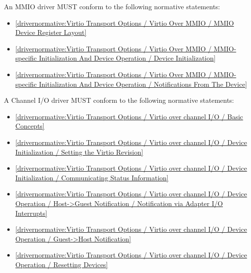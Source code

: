 \label{sec:Conformance / Driver Conformance / MMIO Driver Conformance}

An MMIO driver MUST conform to the following normative statements:

\begin{itemize}
\item \ref{drivernormative:Virtio Transport Options / Virtio Over MMIO / MMIO Device Register Layout}
\item \ref{drivernormative:Virtio Transport Options / Virtio Over MMIO / MMIO-specific Initialization And Device Operation / Device Initialization}
\item \ref{drivernormative:Virtio Transport Options / Virtio Over MMIO / MMIO-specific Initialization And Device Operation / Notifications From The Device}
\end{itemize}

\label{sec:Conformance / Driver Conformance / Channel I/O Driver Conformance}

A Channel I/O driver MUST conform to the following normative statements:

\begin{itemize}
\item \ref{drivernormative:Virtio Transport Options / Virtio over channel I/O / Basic Concepts}
\item \ref{drivernormative:Virtio Transport Options / Virtio over channel I/O / Device Initialization / Setting the Virtio Revision}
\item \ref{drivernormative:Virtio Transport Options / Virtio over channel I/O / Device Initialization / Communicating Status Information}
\item \ref{drivernormative:Virtio Transport Options / Virtio over channel I/O / Device Operation / Host->Guest Notification / Notification via Adapter I/O Interrupts}
\item \ref{drivernormative:Virtio Transport Options / Virtio over channel I/O / Device Operation / Guest->Host Notification}
\item \ref{drivernormative:Virtio Transport Options / Virtio over channel I/O / Device Operation / Resetting Devices}
\end{itemize}

